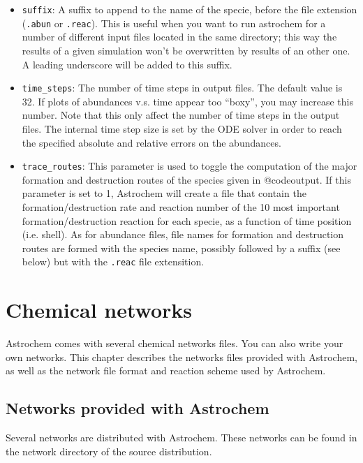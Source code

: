 \documentclass[a4paper,12pt]{article}
\begin{document}
{\begin{itemize}
\item \verb=suffix=: A suffix to append to the name of the specie,
  before the file extension (\verb=.abun= or \verb=.reac=). This is
  useful when you want to run astrochem for a number of different
  input files located in the same directory; this way the results of a
  given simulation won't be overwritten by results of an other one. A
  leading underscore will be added to this suffix.

\item \verb=time_steps=: The number of time steps in output files. The
  default value is 32. If plots of abundances v.s. time appear too
  ``boxy'', you may increase this number. Note that this only affect
  the number of time steps in the output files. The internal time step
  size is set by the ODE solver in order to reach the specified
  absolute and relative errors on the abundances.

\item \verb=trace_routes=: This parameter is used to toggle the
  computation of the major formation and destruction routes of the
  species given in @code{output}. If this parameter is set to 1,
  Astrochem will create a file that contain the formation/destruction
  rate and reaction number of the 10 most important
  formation/destruction reaction for each specie, as a function of
  time position (i.e. shell). As for abundance files, file names for
  formation and destruction routes are formed with the species name,
  possibly followed by a suffix (see below) but with the \verb=.reac=
  file extensition.

\end{itemize}

\section{Chemical networks}
\label{sec:chemical-networks}

Astrochem comes with several chemical networks files. You can also write
your own networks. This chapter describes the networks files provided
with Astrochem, as well as the network file format and reaction scheme
used by Astrochem.

\subsection{Networks provided with Astrochem}
\label{sec:netw-prov-with}

Several networks are distributed with Astrochem.  These networks can
be found in the network directory of the source distribution.

}
\end{document}
